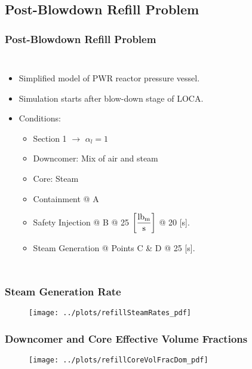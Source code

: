 \documentclass[compress,xcolor=table]{beamer}
\begin{document}
\subsection[Post-Blowdown Refill Problem]{Post-Blowdown Refill Problem}
\begin{frame}
\frametitle{Post-Blowdown Refill Problem}
\begin{columns}
\begin{itemize}
\item{Simplified model of PWR reactor pressure vessel.}
\item{Simulation starts after blow-down stage of LOCA.}
\item{Conditions:
\begin{itemize}
\item{Section 1 $\rightarrow$ $\alpha_{l} = 1$}
\item{Downcomer: Mix of air and steam}
\item{Core: Steam}
\item{Containment @ A}
\item{Safety Injection @ B @ 25 $\displaystyle \left[ \frac{\lbm{}}{\text{s}} \right]$ @ 20 [s].}
\item{Steam Generation @ Points C \& D @ 25 [s].}
\end{itemize}
}
\end{itemize}


\begin{figure}[h!t]
\centering
\resizebox{!}{0.65\textheight}{}
\end{figure}
\end{columns}

\end{frame}
\begin{frame}
\frametitle{Steam Generation Rate}

\begin{figure}[h!t]
\centering
\texttt{[image: ../plots/refillSteamRates\_pdf]}
\end{figure}

\end{frame}
\begin{frame}
\frametitle{Downcomer and Core Effective Volume Fractions}

\begin{figure}[h!t]
\centering
\texttt{[image: ../plots/refillCoreVolFracDom\_pdf]}
\end{figure}

\end{frame}
\end{document}
